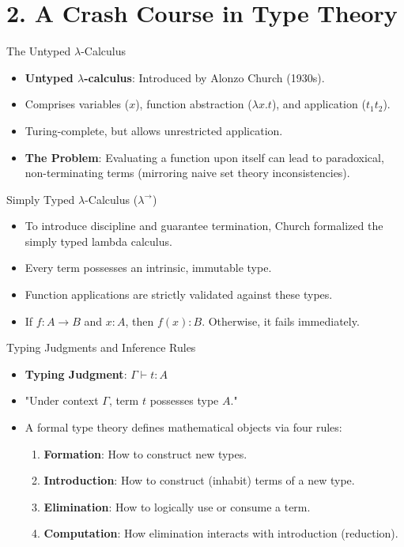 \documentclass[12pt, aspectratio=169]{beamer}
\begin{document}
\section{2. A Crash Course in Type Theory}

\begin{frame}{The Untyped $\lambda$-Calculus}
\begin{itemize}\setlength{\itemsep}{1.2em}
  \item \textbf{Untyped $\lambda$-calculus}: Introduced by Alonzo Church (1930s).
  \item Comprises variables ($x$), function abstraction ($\lambda x. t$), and application ($t_1 t_2$).
  \item Turing-complete, but allows unrestricted application.
  \item \textbf{The Problem}: Evaluating a function upon itself can lead to paradoxical, non-terminating terms (mirroring naive set theory inconsistencies).
\end{itemize}
\end{frame}

\begin{frame}{Simply Typed $\lambda$-Calculus ($\lambda^{\to}$)}
\begin{itemize}\setlength{\itemsep}{1.2em}
  \item To introduce discipline and guarantee termination, Church formalized the simply typed lambda calculus.
  \item Every term possesses an intrinsic, immutable type.
  \item Function applications are strictly validated against these types.
  \item If $f : A \to B$ and $x : A$, then $f(x) : B$. Otherwise, it fails immediately.
\end{itemize}
\end{frame}

\begin{frame}{Typing Judgments and Inference Rules}
\begin{itemize}\setlength{\itemsep}{1.2em}
  \item \textbf{Typing Judgment}: $\Gamma \vdash t : A$ 
  \item "Under context $\Gamma$, term $t$ possesses type $A$."
  \item A formal type theory defines mathematical objects via four rules:
  \begin{enumerate}
      \item \textbf{Formation}: How to construct new types.
      \item \textbf{Introduction}: How to construct (inhabit) terms of a new type.
      \item \textbf{Elimination}: How to logically use or consume a term.
      \item \textbf{Computation}: How elimination interacts with introduction (reduction).
  \end{enumerate}
\end{itemize}
\end{frame}
\end{document}
